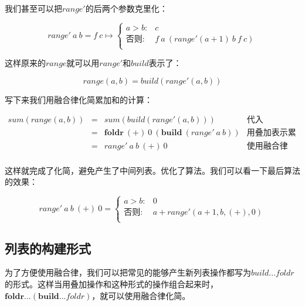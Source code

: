 \documentclass{article}
\begin{document}
我们甚至可以把$range'$的后两个参数克里化：

\[
range'\ a\ b = f\ c \mapsto
  \begin{cases}
  a > b: & c \\
  \text{否则}: & f\ a\ (range' (a+1)\ b\ f\ c) \\
  \end{cases}
\]

这样原来的$range$就可以用$range'$和$build$表示了：

\[
range(a, b) = build(range'(a, b))
\]

写下来我们用融合律化简累加和的计算：

\[
\begin{array}{rcll}
sum(range(a, b)) & = & sum(build(range'(a, b))) & \text{代入} \\
  & = & \pmb{foldr}\ (+)\ 0\ (\pmb{build}\ (range'\ a\ b)) & \text{用叠加表示累加} \\
  & = & range'\ a\ b\ (+)\ 0 & \text{使用融合律} \\
\end{array}
\]

这样就完成了化简，避免产生了中间列表。优化了算法。我们可以看一下最后算法的效果：

\[
range'\ a\ b\ (+)\ 0 =
  \begin{cases}
  a > b: & 0 \\
  \text{否则}: & a + range'(a+1, b, (+), 0) \\
  \end{cases}
\]

\subsection{列表的构建形式}

为了方便使用融合律，我们可以把常见的能够产生新列表操作都写为$build...foldr$的形式。这样当用叠加操作和这种形式的操作组合起来时，$\pmb{foldr}...(\pmb{build}...foldr)$，就可以使用融合律化简。
\end{document}
